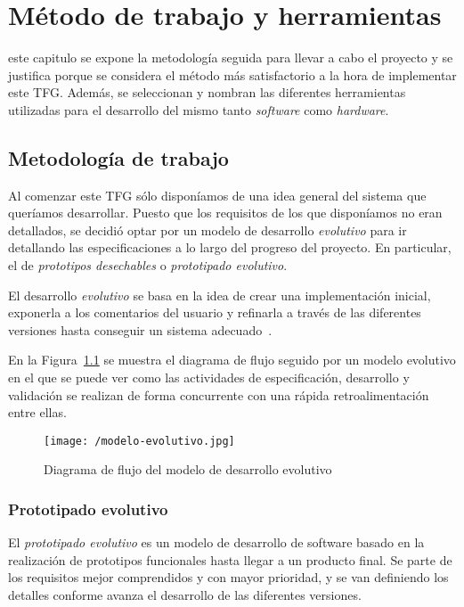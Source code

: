 \chapter{Método de trabajo y herramientas}
\label{chap:metodo}

 este capitulo se expone la metodología seguida para llevar a cabo el proyecto y se
justifica porque se considera el método más satisfactorio a la hora de implementar este
\acs{TFG}. Además, se seleccionan y nombran las diferentes herramientas utilizadas para el
desarrollo del mismo tanto \emph{software} como \emph{hardware}.

\section{Metodología de trabajo}
\label{sec:metodologia}

Al comenzar este \acs{TFG} sólo disponíamos de una idea general del sistema que queríamos
desarrollar. Puesto que los requisitos de los que disponíamos no eran detallados, se decidió optar
por un modelo de desarrollo \emph{evolutivo} para ir detallando las especificaciones a lo largo del
progreso del proyecto. En particular, el de \emph{prototipos desechables} o \emph{prototipado
  evolutivo}.

El desarrollo \emph{evolutivo} se basa en la idea de crear una implementación inicial,
exponerla a los comentarios del usuario y refinarla a través de las diferentes versiones hasta
conseguir un sistema adecuado~\cite{Sommerville14}.

En la Figura~\ref{fig:modelo-evolutivo} se muestra el diagrama de flujo seguido por un modelo
evolutivo en el que se puede ver como las actividades de especificación, desarrollo y validación se
realizan de forma concurrente con una rápida retroalimentación entre ellas.

\begin{figure}[!h]
  \begin{center}
    \texttt{[image: /modelo-evolutivo.jpg]}
    \caption{Diagrama de flujo del modelo de desarrollo evolutivo}
    \label{fig:modelo-evolutivo}
  \end{center}
\end{figure}

\subsection{Prototipado evolutivo}

El \emph{prototipado evolutivo} es un modelo de desarrollo de software basado en la realización de
prototipos funcionales hasta llegar a un producto final. Se parte de los requisitos mejor
comprendidos y con mayor prioridad, y se van definiendo los detalles conforme avanza el desarrollo
de las diferentes versiones.

